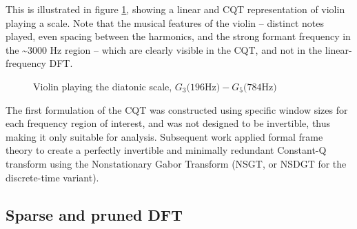\documentclass[letter,12pt,notitlepage]{article}
\begin{document}
This is illustrated in figure \ref{fig:violin}, showing a linear and CQT representation of violin playing a scale. Note that the musical features of the violin -- distinct notes played, even spacing between the harmonics, and the strong formant frequency in the \textasciitilde3000 Hz region -- which are clearly visible in the CQT, and not in the linear-frequency DFT.

\begin{figure}[ht]
	\centering
	\hspace{0.5em}
	\caption{Violin playing the diatonic scale, $G_{3} \text{(196Hz)} - G_{5} \text{(784Hz)}$}
	\label{fig:violin}
\end{figure}

The first formulation of the CQT was constructed using specific window sizes for each frequency region of interest, and was not designed to be invertible, thus making it only suitable for analysis. Subsequent work \cite{balazs, jaillet} applied formal frame theory to create a perfectly invertible and minimally redundant Constant-Q transform using the Nonstationary Gabor Transform (NSGT, or NSDGT for the discrete-time variant).

\subsection{Sparse and pruned DFT}
\end{document}
